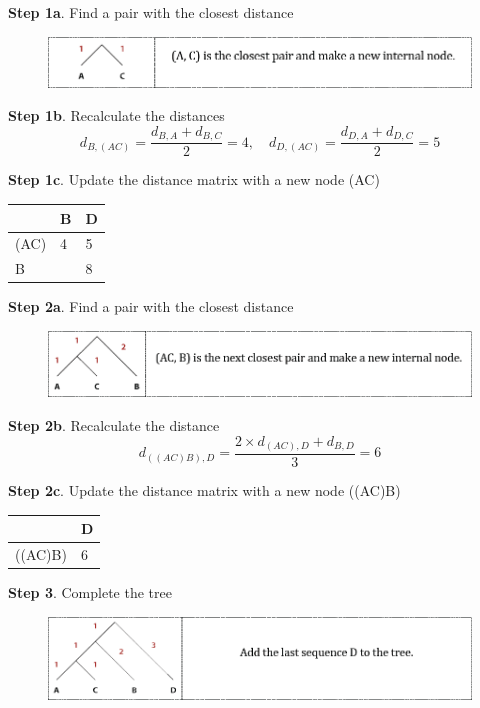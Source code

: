 \noindent
\textbf{Step 1a}.
Find a pair with the closest distance
\begin{figure}[H]
  \centering
      \includegraphics[width=0.9 \textwidth]{fig09/upgma_1.png}
\end{figure}

\noindent
\textbf{Step 1b}.
Recalculate the distances
\[
d_{B,(AC)}=\dfrac{d_{B,A} + d_{B,C}}{2} = 4, \quad d_{D,(AC)}=\dfrac{d_{D,A} + d_{D,C}}{2} = 5
\]

\noindent
\textbf{Step 1c}.
Update the distance matrix with a new node (AC)
\begin{table}[H]
\centering
\begin{tabular}{|l|l|l|}
\hline
     & B & D \\ \hline
(AC) & 4 & 5 \\ \hline
B    &   & 8 \\ \hline
\end{tabular}
\end{table}

\noindent
\textbf{Step 2a}.
Find a pair with the closest distance
\begin{figure}[H]
  \centering
      \includegraphics[width=0.9 \textwidth]{fig09/upgma_2.png}
\end{figure}

\noindent
\textbf{Step 2b}.
Recalculate the distance
\[
d_{((AC)B),D}=\dfrac{2 \times d_{(AC),D} + d_{B,D}}{3} = 6
\]

\noindent
\textbf{Step 2c}.
Update the distance matrix with a new node ((AC)B)
\begin{table}[H]
\centering
\begin{tabular}{|l|l|}
\hline
        & D \\ \hline
((AC)B) & 6 \\ \hline
\end{tabular}
\end{table}

\noindent
\textbf{Step 3}.
Complete the tree
\begin{figure}[H]
  \centering
      \includegraphics[width=0.9 \textwidth]{fig09/upgma_3.png}
\end{figure}

